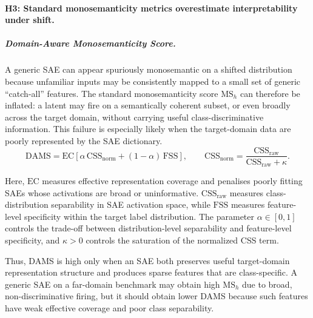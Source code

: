 \vspace{-4pt}
\paragraph{H3: Standard monosemanticity metrics overestimate interpretability under shift.}
\label{sec:exp:h3}

\vspace{-4pt}
\subparagraph{Domain-Aware Monosemanticity Score.}
A generic SAE can appear spuriously monosemantic on a shifted distribution because
unfamiliar inputs may be consistently mapped to a small set of generic
``catch-all'' features. The standard monosemanticity score $\mathrm{MS}_h$
can therefore be inflated: a latent may fire on a semantically coherent subset,
or even broadly across the target domain, without carrying useful
class-discriminative information. This failure is especially likely when the
target-domain data are poorly represented by the SAE dictionary.
\vspace{-4pt}
\begin{equation}
\label{eq:dams}
\mathrm{DAMS}
=
\mathrm{EC}
\left[
\alpha\,\mathrm{CSS}_{\mathrm{norm}}
+
(1-\alpha)\,\mathrm{FSS}
\right],
\qquad
\mathrm{CSS}_{\mathrm{norm}}
=
\frac{\mathrm{CSS}_{\mathrm{raw}}}
{\mathrm{CSS}_{\mathrm{raw}}+\kappa}.
\end{equation}



Here, $\mathrm{EC}$ measures effective representation coverage and penalises
poorly fitting SAEs whose activations are broad or uninformative.
$\mathrm{CSS}_{\mathrm{raw}}$ measures class-distribution separability in SAE
activation space, while $\mathrm{FSS}$ measures feature-level specificity within
the target label distribution. The parameter $\alpha\in[0,1]$ controls the
trade-off between distribution-level separability and feature-level specificity,
and $\kappa>0$ controls the saturation of the normalized CSS term.

Thus, DAMS is high only when an SAE both preserves useful target-domain
representation structure and produces sparse features that are class-specific.
A generic SAE on a far-domain benchmark may obtain high $\mathrm{MS}_h$ due to
broad, non-discriminative firing, but it should obtain lower DAMS because such
features have weak effective coverage and poor class separability.





\vspace{-4pt}
